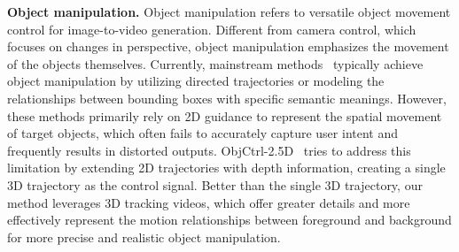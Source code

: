 \textbf{Object manipulation.} 
Object manipulation refers to versatile object movement control for image-to-video generation. Different from camera control, which focuses on changes in perspective, object manipulation emphasizes the movement of the objects themselves. 
Currently, mainstream methods~\cite{chen2023motion,li2024image,mou2024revideo,teng2023drag,wang2024motionctrl,yin2023dragnuwa,jain2024peekaboo,ma2024trailblazer,qiu2024freetraj,wang2024boximator,yang2024direct,geng2024motion} typically achieve object manipulation by utilizing directed trajectories or modeling the relationships between bounding boxes with specific semantic meanings. However, these methods primarily rely on 2D guidance to represent the spatial movement of target objects, which often fails to accurately capture user intent and frequently results in distorted outputs. ObjCtrl-2.5D~\cite{wang2024objctrl} tries to address this limitation by extending 2D trajectories with depth information, creating a single 3D trajectory as the control signal. Better than the single 3D trajectory, our method leverages 3D tracking videos, which offer greater details and more effectively represent the motion relationships between foreground and background for more precise and realistic object manipulation.



